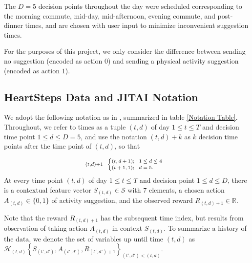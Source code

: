 The $D=5$ decision points throughout the day were scheduled corresponding to the morning commute, mid-day, mid-afternoon, evening commute, and post-dinner times, and are chosen with user input to minimize inconvenient suggestion times.

For the purposes of this project, we only consider the difference between sending no suggestion (encoded as action $0$) and sending a physical activity suggestion (encoded as action $1$).



\subsection{HeartSteps Data and JITAI Notation}

	We adopt the following notation as in \citet{Liao2015}, summarized in table \ref{Notation Table}.  Throughout, we refer to times as a tuple $(t,d)$ of day $1 \le t \le T$ and decision time point $1 \le d \le D = 5$, and use the notation $(t,d) + k$ as $k$ decision time points after the time point of $(t,d)$, so that 

	\begin{equation}\scriptstyle \scriptsize (t,d) + 1 = \begin{cases}
(t,d+1);\ \  1 \le d \le 4 \\
(t+1, 1); \ \ d = 5.
\end{cases}\end{equation}
	At every time point $(t,d)$ of day $1 \le t \le T$ and decision point $1 \le d \le D$, there is a contextual feature vector $S_{(t,d)} \in \mathcal{S}$ with $7$ elements, a chosen action $A_{(t,d)} \in \{0,1\}$ of activity suggestion, and the observed reward $R_{(t,d)+1} \in \mathbb{R}$.  
	
	Note that the reward $R_{(t,d)+1}$ has the subsequent time index, but results from observation of taking action $A_{(t,d)}$ in context $S_{(t,d)}$.  To summarize a history of the data, we denote the set of variables up until time $(t,d)$ as $\mathcal{H}_{(t,d)}\left\{S_{(t',d')}, A_{(t',d')}, R_{(t',d') + 1} \right\}_{(t',d') < (t,d)}$\label{HistorySet}.

